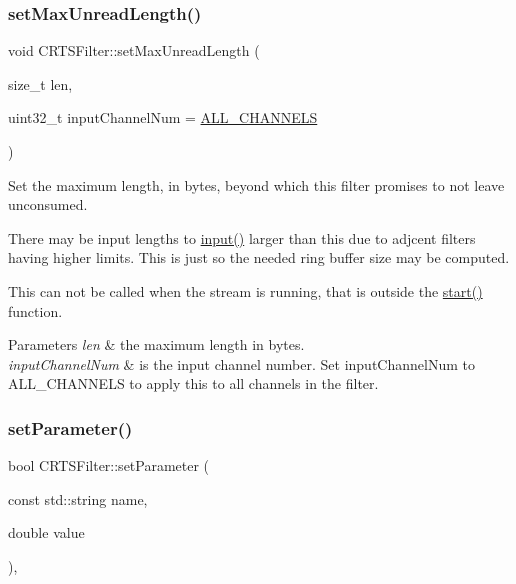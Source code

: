 \subsubsection{\texorpdfstring{set\+Max\+Unread\+Length()}{setMaxUnreadLength()}}
{\footnotesize\ttfamily void C\+R\+T\+S\+Filter\+::set\+Max\+Unread\+Length (\begin{DoxyParamCaption}\item[{size\+\_\+t}]{len,  }\item[{uint32\+\_\+t}]{input\+Channel\+Num = {\ttfamily \hyperlink{classCRTSFilter_a9ea354654e8e2e8ce3bff293cc35fafe}{A\+L\+L\+\_\+\+C\+H\+A\+N\+N\+E\+LS}} }\end{DoxyParamCaption})\hspace{0.3cm}{\ttfamily [protected]}}

Set the maximum length, in bytes, beyond which this filter promises to not leave unconsumed.

There may be input lengths to \hyperlink{classCRTSFilter_ab75eb3db5914c0d6b3781439d46b2301}{input()} larger than this due to adjcent filters having higher limits. This is just so the needed ring buffer size may be computed.

This can not be called when the stream is running, that is outside the \hyperlink{classCRTSFilter_a15a3e99b38a67fd40559776d468b95fa}{start()} function.


\begin{DoxyParams}{Parameters}
{\em len} & the maximum length in bytes.\\
\hline
{\em input\+Channel\+Num} & is the input channel number. Set {\ttfamily input\+Channel\+Num} to {\ttfamily A\+L\+L\+\_\+\+C\+H\+A\+N\+N\+E\+LS} to apply this to all channels in the filter. \\
\hline
\end{DoxyParams}
\mbox{\label{classCRTSFilter_a33ee2e0151f822aec425d6d22ab94757}} 
\subsubsection{\texorpdfstring{set\+Parameter()}{setParameter()}}
{\footnotesize\ttfamily bool C\+R\+T\+S\+Filter\+::set\+Parameter (\begin{DoxyParamCaption}\item[{const std\+::string}]{name,  }\item[{double}]{value }\end{DoxyParamCaption})\hspace{0.3cm}{\ttfamily [inline]}, {\ttfamily [protected]}}

